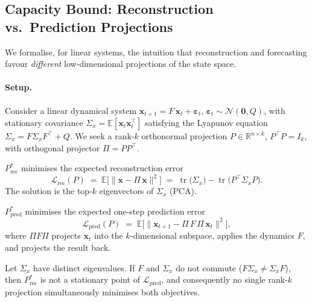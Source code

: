 
\subsection{Capacity Bound: Reconstruction vs.\ Prediction Projections}
\label{sec:capacity-bound}

We formalise, for linear systems, the intuition that reconstruction and
forecasting favour \emph{different} low-dimensional projections of the
state space.

\paragraph{Setup.}
Consider a linear dynamical system
$\mathbf{x}_{t+1} = F\,\mathbf{x}_t + \boldsymbol{\varepsilon}_t$,
$\boldsymbol{\varepsilon}_t \sim \mathcal{N}(\mathbf{0}, Q)$,
with stationary covariance $\Sigma_x = \mathbb{E}[\mathbf{x}_t \mathbf{x}_t^\top]$
satisfying the Lyapunov equation $\Sigma_x = F \Sigma_x F^\top + Q$.
We seek a rank-$k$ orthonormal projection
$P \in \mathbb{R}^{n \times k}$, $P^\top P = I_k$,
with orthogonal projector $\Pi = P P^\top$.

\begin{definition}
$P_{\mathrm{rec}}^*$ minimises the expected reconstruction error
\[
  \mathcal{L}_{\mathrm{rec}}(P) \;=\;
  \mathbb{E}\bigl[\lVert \mathbf{x} - \Pi\,\mathbf{x} \rVert^2\bigr]
  \;=\; \operatorname{tr}\!\bigl(\Sigma_x\bigr)
        - \operatorname{tr}\!\bigl(P^\top \Sigma_x P\bigr).
\]
The solution is the top-$k$ eigenvectors of $\Sigma_x$ (PCA).
\end{definition}

\begin{definition}
$P_{\mathrm{pred}}^*$ minimises the expected one-step prediction error
\[
  \mathcal{L}_{\mathrm{pred}}(P) \;=\;
  \mathbb{E}\bigl[\lVert \mathbf{x}_{t+1}
        - \Pi\,F\,\Pi\,\mathbf{x}_t \rVert^2\bigr],
\]
where $\Pi F \Pi$ projects $\mathbf{x}_t$ into the $k$-dimensional
subspace, applies the dynamics $F$, and projects the result back.
\end{definition}

\begin{proposition}
\label{prop:capacity}
Let $\Sigma_x$ have distinct eigenvalues.
If $F$ and $\Sigma_x$ do not commute ($F\Sigma_x \neq \Sigma_x F$),
then $P_{\mathrm{rec}}^*$ is not a stationary point of
$\mathcal{L}_{\mathrm{pred}}$, and consequently no single rank-$k$
projection simultaneously minimises both objectives.
\end{proposition}

